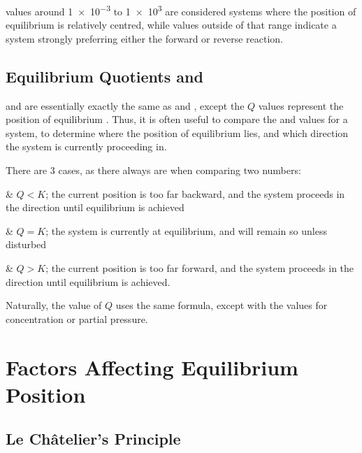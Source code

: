 			\Kc{} values around \num{1e-3} to \num{1e3} are considered systems where the position of equilibrium is relatively centred,
			while values outside of that range indicate a system strongly preferring either the forward or reverse reaction.



		\subsection{Equilibrium Quotients \texorpdfstring{}{Qc} and \texorpdfstring{}{Qp}}

			\Qc{} and \Qp{} are essentially exactly the same as \Kc{} and \Kp{}, except the $Q$ values represent the position of equilibrium
			. Thus, it is often useful to compare the \Qc{} and \Kc{} values for a system, to determine
			where the  position of equilibrium lies, and which direction the system is currently proceeding in.

			There are 3 cases, as there always are when comparing two numbers:

			\begin{bulletlist}
				& $Q < K$; the current position is too far backward, and the system proceeds in the  direction until equilibrium
				is achieved

				& $Q = K$; the system is currently at equilibrium, and will remain so unless disturbed

				& $Q > K$; the current position is too far forward, and the system proceeds in the  direction until equilibrium
				is achieved.
			\end{bulletlist}

			Naturally, the value of $Q$ uses the same formula, except with the  values for concentration or partial
			pressure.





	\pagebreak
	\section{Factors Affecting Equilibrium Position}

		\subsection{Le Châtelier's Principle}

